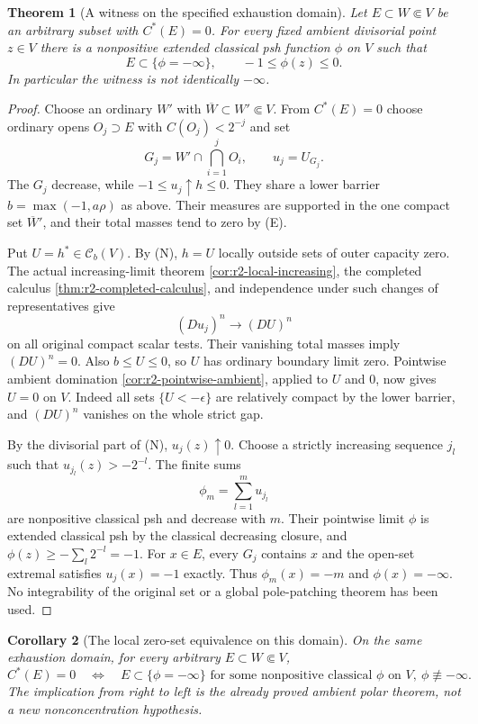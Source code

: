\documentclass[11pt,a4paper]{article}
\numberwithin{equation}{section}
\newtheorem{theorem}{Theorem}[section]
\newtheorem{corollary}[theorem]{Corollary}
\theoremstyle{definition}
\theoremstyle{remark}
\newcommand{\Cb}{\mathcal C_b}
\begin{document}
\begin{theorem}[A witness on the specified exhaustion domain]
\label{thm:r2-capacity-zero-polar-witness}
Let $E\subset W\Subset V$ be an arbitrary subset with $C^*(E)=0$.
For every fixed ambient divisorial point $z\in V$ there is a nonpositive
extended classical psh function $\phi$ on $V$ such that
\[
 E\subset\{\phi=-\infty\},\qquad -1\leq\phi(z)\leq0.
\]
In particular the witness is not identically $-\infty$.
\end{theorem}

\begin{proof}
Choose an ordinary $W'$ with
$\overline W\subset W'\Subset V$. From $C^*(E)=0$ choose ordinary
opens $O_j\supset E$ with $C(O_j)<2^{-j}$ and set
\[
 G_j=W'\cap\bigcap_{i=1}^jO_i,\qquad u_j=U_{G_j}.
\]
The $G_j$ decrease, while $-1\leq u_j\uparrow h\leq0$.
They share a lower barrier $b=\max(-1,a\rho)$ as above.
Their measures are supported in the one compact set
$\overline W'$, and their total masses tend to zero by \textup{(E)}.

Put $U=h^*\in\Cb(V)$. By \textup{(N)}, $h=U$ locally outside
sets of outer capacity zero. The actual increasing-limit theorem
\ref{cor:r2-local-increasing}, the completed calculus
\ref{thm:r2-completed-calculus}, and independence under such changes
of representatives give
\[
 (Du_j)^n\longrightarrow(DU)^n
\]
on all original compact scalar tests. Their vanishing total masses
imply $(DU)^n=0$. Also $b\leq U\leq0$, so $U$ has ordinary
boundary limit zero. Pointwise ambient domination
\ref{cor:r2-pointwise-ambient}, applied to $U$ and $0$, now gives
$U=0$ on $V$. Indeed all sets $\{U<-\epsilon\}$ are relatively
compact by the lower barrier, and $(DU)^n$ vanishes on the whole
strict gap.

By the divisorial part of \textup{(N)}, $u_j(z)\uparrow0$.
Choose a strictly increasing sequence $j_l$ such that
$u_{j_l}(z)>-2^{-l}$. The finite sums
\[
 \phi_m=\sum_{l=1}^m u_{j_l}
\]
are nonpositive classical psh and decrease with $m$. Their pointwise
limit $\phi$ is extended classical psh by the classical decreasing
closure, and $\phi(z)\geq-\sum_l2^{-l}=-1$.
For $x\in E$, every $G_j$ contains $x$ and the open-set extremal
satisfies $u_j(x)=-1$ exactly. Thus $\phi_m(x)=-m$ and
$\phi(x)=-\infty$. No integrability of the original set or a
global pole-patching theorem has been used.
\end{proof}

\begin{corollary}[The local zero-set equivalence on this domain]
\label{cor:r2-local-polar-equivalence}
On the same exhaustion domain, for every arbitrary $E\subset W\Subset V$,
\[
 C^*(E)=0
 \quad\Longleftrightarrow\quad
 E\subset\{\phi=-\infty\}
 \text{ for some nonpositive classical }\phi\text{ on }V,
 \ \phi\not\equiv-\infty.
\]
The implication from right to left is the already proved ambient
polar theorem, not a new nonconcentration hypothesis.
\end{corollary}
\end{document}
